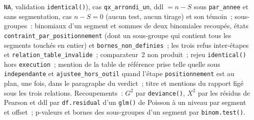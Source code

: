 \documentclass[a4paper,11pt]{article}
\newcommand{\code}[1]{\texttt{\small #1}}
\begin{document}
{\begin{itemize}[leftmargin=*, itemsep=2pt]
    \code{NA}, validation \code{identical()}), cas \code{qx\_arrondi\_un},
    ddl $= n - S$ sous \code{par\_annee} et sans segmentation, cas $n - S =
    0$ (aucun test, aucun tirage) et son témoin~; sous-groupes~: binomiaux
    d'un segment et sommes de deux binomiales recoupés, états
    \code{contraint\_par\_positionnement} (dont un sous-groupe qui contient
    tous les segments touchés en entier) et \code{bornes\_non\_definies}~;
    les trois refus inter-étapes et \code{relation\_table\_invalide}~;
    comparateur~2 non produit~; rejeu \code{identical()} hors
    \code{execution}~; mention de la table de référence prise telle quelle
sous \code{independante} et \code{ajustee\_hors\_outil} quand l'étape
\code{positionnement} est au plan, une fois, dans le paragraphe du
verdict~; titre et mentions du rapport figé sous les trois
    relations. Recoupements~: $G^2$ par \code{deviance()}, $X^2$ par les
    résidus de Pearson et ddl par \code{df.residual} d'un \code{glm()} de
    Poisson à un niveau par segment et offset~; p-valeurs et bornes des
    sous-groupes d'un segment par \code{binom.test()}.
\end{itemize}\par}
\end{document}
